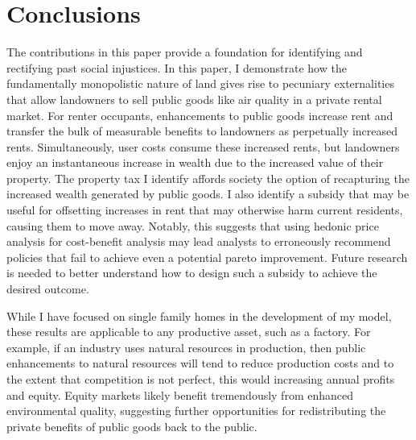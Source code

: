 \documentclass[ecta,nameyear,draft]{econsocart}
\theoremstyle{plain}
\theoremstyle{remark}
\begin{document}
\section{Conclusions}
The contributions in this paper provide a foundation for identifying and rectifying past social injustices. In this paper, I demonstrate how the fundamentally monopolistic nature of land gives rise to pecuniary externalities that allow landowners to sell public goods like air quality in a private rental market. For renter occupants, enhancements to public goods increase rent and transfer the bulk of measurable benefits to landowners as perpetually increased rents. Simultaneously, user costs consume these increased rents, but landowners enjoy an instantaneous increase in wealth due to the increased value of their property. The property tax I identify affords society the option of recapturing the increased wealth generated by public goods. I also identify a subsidy that may be useful for offsetting increases in rent that may otherwise harm current residents, causing them to move away. Notably, this suggests that using hedonic price analysis for cost-benefit analysis may lead analysts to erroneously recommend policies that fail to achieve even a potential pareto improvement. Future research is needed to better understand how to design such a subsidy to achieve the desired outcome.

While I have focused on single family homes in the development of my model, these results are applicable to any productive asset, such as a factory. For example, if an industry uses natural resources in production, then public enhancements to natural resources will tend to reduce production costs and to the extent that competition is not perfect, this would increasing annual profits and equity. Equity markets likely benefit tremendously from enhanced environmental quality, suggesting further opportunities for redistributing the private benefits of public goods back to the public.
 
\end{document}
